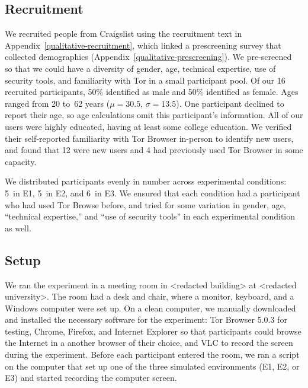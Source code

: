 \documentclass[USenglish,oneside,twocolumn]{article}
\begin{document}
\subsection{Recruitment}
We recruited people from Craigslist using the recruitment text in Appendix~\ref{qualitative-recruitment}, which linked a prescreening survey that collected demographics (Appendix~\ref{qualitative-prescreening}). We pre-screened~\cite{screening} so that we could have a diversity of gender, age, technical expertise, use of security tools, and familiarity with Tor in a small participant pool. Of our 16 recruited participants, 50\% identified as male and 50\% identified as female. Ages ranged from 20 to~62 years ($\mu = 30.5$, $\sigma = 13.5$). One participant declined to report their age, so age calculations omit this participant's information. All of our users were highly educated, having at least some college education. We verified their self-reported familiarity with Tor Browser in-person to identify new users, and found that 12 were new users and 4 had previously used Tor Browser in some capacity.  



We distributed participants evenly in number across experimental conditions:  5~in E1, 5~in E2, and 6~in E3. We ensured that each condition had a participant who had used Tor Browse before, and tried for some variation in gender, age, ``technical expertise,'' and ``use of security tools'' in each experimental condition as well. 

\subsection{Setup} 
We ran the experiment in a meeting room in <redacted building> at <redacted university>. The room had a desk and chair, where a monitor, keyboard, and a Windows computer were set up. On a clean computer, we manually downloaded and installed the necessary software for the experiment: Tor Browser 5.0.3 for testing, Chrome, Firefox, and Internet Explorer so that participants could browse the Internet in a another browser of their choice, and VLC to record the screen during the experiment. Before each participant entered the room, we ran a script on the computer that
set up one of the three simulated environments (E1, E2, or E3) and started recording the computer screen.  
\end{document}
